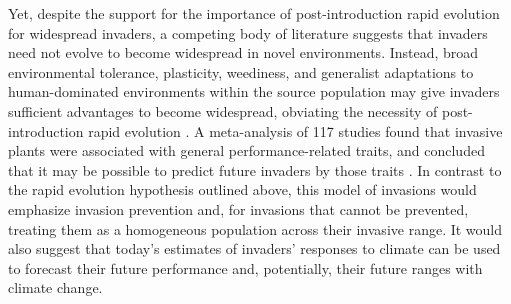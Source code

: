 \documentclass[11pt]{article}\usepackage[]{graphicx}\usepackage[]{color}
\begin{document}
	Yet, despite the support for the importance of post-introduction rapid evolution for widespread invaders, a competing body of literature suggests that invaders need not evolve to become widespread in novel environments. Instead, broad environmental tolerance, plasticity, weediness, and generalist adaptations to human-dominated environments within the source population may give invaders sufficient advantages to become widespread, obviating the necessity of post-introduction rapid evolution \parencite{Richards2006,Schwartz1994,Bock2015,Rejmanek1996,Baker1965}. A meta-analysis of 117 studies found that invasive plants were associated with general performance-related traits, and concluded that it may be possible to predict future invaders by those traits \parencite{VanKleunen2010}. %
	In contrast to the rapid evolution hypothesis outlined above, this model of invasions would emphasize invasion prevention and, for invasions that cannot be prevented, treating them as a homogeneous population across their invasive range. It would also suggest that today's estimates of invaders' responses to climate can be used to forecast their future performance and, potentially, their future ranges with climate change. 
	
\end{document}
